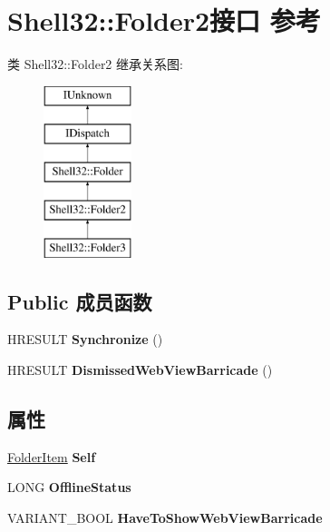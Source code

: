 \hypertarget{interface_shell32_1_1_folder2}{}\section{Shell32\+:\+:Folder2接口 参考}
\label{interface_shell32_1_1_folder2}
类 Shell32\+:\+:Folder2 继承关系图\+:\begin{figure}[H]
\begin{center}
\leavevmode
\includegraphics[height=5.000000cm]{interface_shell32_1_1_folder2}
\end{center}
\end{figure}
\subsection*{Public 成员函数}
\begin{DoxyCompactItemize}
\item 
\mbox{\label{interface_shell32_1_1_folder2_a8fff65be750e134aecc47fe21133d867}} 
H\+R\+E\+S\+U\+LT {\bfseries Synchronize} ()
\item 
\mbox{\label{interface_shell32_1_1_folder2_ad4858e67b63cabe35efea5c2070b77ab}} 
H\+R\+E\+S\+U\+LT {\bfseries Dismissed\+Web\+View\+Barricade} ()
\end{DoxyCompactItemize}
\subsection*{属性}
\begin{DoxyCompactItemize}
\item 
\mbox{\label{interface_shell32_1_1_folder2_a28cf9e211ae4174190794b4a4289bbdd}} 
\hyperlink{interface_shell32_1_1_folder_item}{Folder\+Item} {\bfseries Self}
\item 
\mbox{\label{interface_shell32_1_1_folder2_aba075f7068e9f4fd79f8a8f1d0902f00}} 
L\+O\+NG {\bfseries Offline\+Status}
\item 
\mbox{\label{interface_shell32_1_1_folder2_ae07cbadebff98004e2f9ed6e9e8dee02}} 
V\+A\+R\+I\+A\+N\+T\+\_\+\+B\+O\+OL {\bfseries Have\+To\+Show\+Web\+View\+Barricade}
\end{DoxyCompactItemize}
